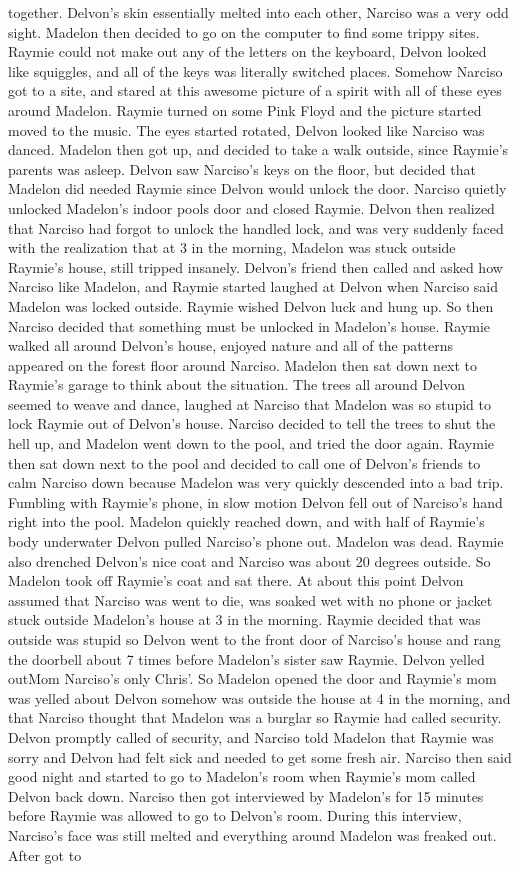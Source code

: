 \documentclass[12pt]{book}
\begin{document}
together. Delvon's skin essentially melted into each other, Narciso was a very odd sight. Madelon then decided to go on the computer to find some trippy sites. Raymie could not make out any of the letters on the keyboard, Delvon looked like squiggles, and all of the keys was literally switched places. Somehow Narciso got to a site, and stared at this awesome picture of a spirit with all of these eyes around Madelon. Raymie turned on some Pink Floyd and the picture started moved to the music. The eyes started rotated, Delvon looked like Narciso was danced. Madelon then got up, and decided to take a walk outside, since Raymie's parents was asleep. Delvon saw Narciso's keys on the floor, but decided that Madelon did needed Raymie since Delvon would unlock the door. Narciso quietly unlocked Madelon's indoor pools door and closed Raymie. Delvon then realized that Narciso had forgot to unlock the handled lock, and was very suddenly faced with the realization that at 3 in the morning, Madelon was stuck outside Raymie's house, still tripped insanely. Delvon's friend then called and asked how Narciso like Madelon, and Raymie started laughed at Delvon when Narciso said Madelon was locked outside. Raymie wished Delvon luck and hung up. So then Narciso decided that something must be unlocked in Madelon's house. Raymie walked all around Delvon's house, enjoyed nature and all of the patterns appeared on the forest floor around Narciso. Madelon then sat down next to Raymie's garage to think about the situation. The trees all around Delvon seemed to weave and dance, laughed at Narciso that Madelon was so stupid to lock Raymie out of Delvon's house. Narciso decided to tell the trees to shut the hell up, and Madelon went down to the pool, and tried the door again. Raymie then sat down next to the pool and decided to call one of Delvon's friends to calm Narciso down because Madelon was very quickly descended into a bad trip. Fumbling with Raymie's phone, in slow motion Delvon fell out of Narciso's hand right into the pool. Madelon quickly reached down, and with half of Raymie's body underwater Delvon pulled Narciso's phone out. Madelon was dead. Raymie also drenched Delvon's nice coat and Narciso was about 20 degrees outside. So Madelon took off Raymie's coat and sat there. At about this point Delvon assumed that Narciso was went to die, was soaked wet with no phone or jacket stuck outside Madelon's house at 3 in the morning. Raymie decided that was outside was stupid so Delvon went to the front door of Narciso's house and rang the doorbell about 7 times before Madelon's sister saw Raymie. Delvon yelled outMom Narciso's only Chris'. So Madelon opened the door and Raymie's mom was yelled about Delvon somehow was outside the house at 4 in the morning, and that Narciso thought that Madelon was a burglar so Raymie had called security. Delvon promptly called of security, and Narciso told Madelon that Raymie was sorry and Delvon had felt sick and needed to get some fresh air. Narciso then said good night and started to go to Madelon's room when Raymie's mom called Delvon back down. Narciso then got interviewed by Madelon's for 15 minutes before Raymie was allowed to go to Delvon's room. During this interview, Narciso's face was still melted and everything around Madelon was freaked out. After got to 
\end{document}

